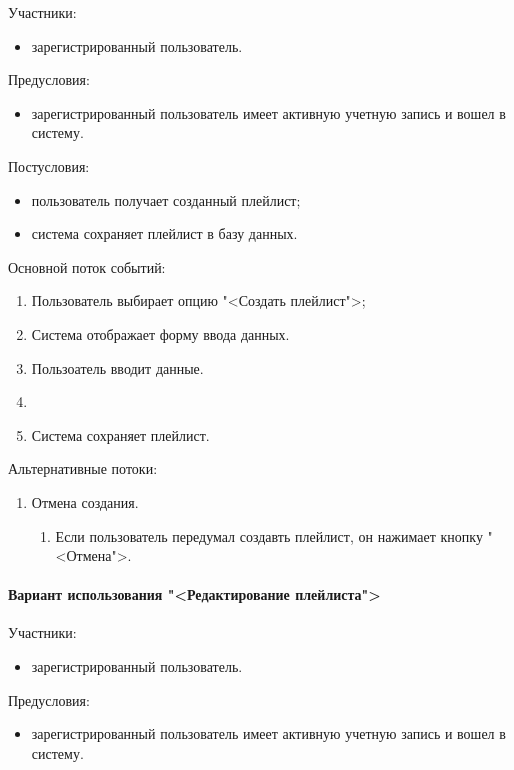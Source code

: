 Участники:
\begin{itemize}
	\item зарегистрированный пользователь.
\end{itemize}

Предусловия:
\begin{itemize}
	\item зарегистрированный пользователь имеет активную учетную запись и вошел в систему.
\end{itemize}

Постусловия:
\begin{itemize}
	\item пользователь получает созданный плейлист;
	\item система сохраняет плейлист в базу данных.
\end{itemize}

Основной поток событий:
\begin{enumerate}
	\item Пользователь выбирает опцию "<Создать плейлист">;
	\item Система отображает форму ввода данных.
	\item Пользоатель вводит данные.
	\item \item Система сохраняет плейлист.
\end{enumerate}
	
Альтернативные потоки:
\begin{enumerate}
	\item Отмена создания.
	\begin{enumerate}
		\item Если пользователь передумал создавть плейлист, он нажимает кнопку "<Отмена">.
	\end{enumerate}
\end{enumerate}

\paragraph{Вариант использования "<Редактирование плейлиста">}


Участники:
\begin{itemize}
	\item зарегистрированный пользователь.
\end{itemize}

Предусловия:
\begin{itemize}
	\item зарегистрированный пользователь имеет активную учетную запись и вошел в систему.
\end{itemize}

